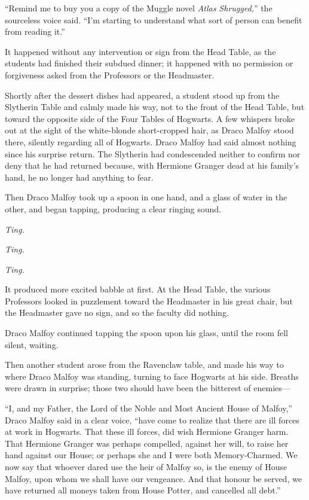 “Remind me to buy you a copy of the Muggle novel \emph{Atlas Shrugged,}” the sourceless voice said. “I’m starting to understand what sort of person can benefit from reading it.”


It happened without any intervention or sign from the Head Table, as the students had finished their subdued dinner; it happened with no permission or forgiveness asked from the Professors or the Headmaster.

Shortly after the dessert dishes had appeared, a student stood up from the Slytherin Table and calmly made his way, not to the front of the Head Table, but toward the opposite side of the Four Tables of Hogwarts. A few whispers broke out at the sight of the white-blonde short-cropped hair, as Draco Malfoy stood there, silently regarding all of Hogwarts. Draco Malfoy had said almost nothing since his surprise return. The Slytherin had condescended neither to confirm nor deny that he had returned because, with Hermione Granger dead at his family’s hand, he no longer had anything to fear.

Then Draco Malfoy took up a spoon in one hand, and a glass of water in the other, and began tapping, producing a clear ringing sound.

\emph{Ting.}

\emph{Ting.}

\emph{Ting.}

It produced more excited babble at first. At the Head Table, the various Professors looked in puzzlement toward the Headmaster in his great chair, but the Headmaster gave no sign, and so the faculty did nothing.

Draco Malfoy continued tapping the spoon upon his glass, until the room fell silent, waiting.

Then another student arose from the Ravenclaw table, and made his way to where Draco Malfoy was standing, turning to face Hogwarts at his side. Breaths were drawn in surprise; those two should have been the bitterest of enemies—

“I, and my Father, the Lord of the Noble and Most Ancient House of Malfoy,” Draco Malfoy said in a clear voice, “have come to realize that there are ill forces at work in Hogwarts. That these ill forces, did wish Hermione Granger harm. That Hermione Granger was perhaps compelled, against her will, to raise her hand against our House; or perhaps she and I were both Memory-Charmed. We now say that whoever dared use the heir of Malfoy so, is the enemy of House Malfoy, upon whom we shall have our vengeance. And that honour be served, we have returned all moneys taken from House Potter, and cancelled all debt.”

